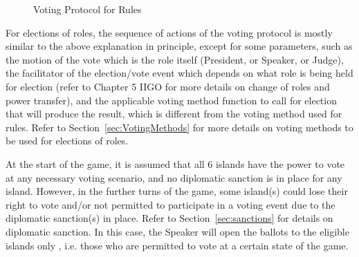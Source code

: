 \begin{figure}[!htb]
\begin{center}
\caption{Voting Protocol for Rules}
\label{fig:RONRVotingProtocol}
\end{center}
\end{figure}

For elections of roles, the sequence of actions of the voting protocol is mostly similar to the above explanation in principle, except for some parameters, such as the motion of the vote which is the role itself (President, or Speaker, or Judge), the facilitator of the election/vote event which depends on what role is being held for election (refer to Chapter 5 IIGO for more details on change of roles and power transfer), and the applicable voting method function to call for election that will produce the result, which is different from the voting method used for rules. Refer to Section~\ref{sec:VotingMethods} for more details on voting methods to be used for elections of roles.

At the start of the game, it is assumed that all 6 islands have the power to vote at any necessary voting scenario, and no diplomatic sanction is in place for any island. However, in the further turns of the game, some island(s) could lose their right to vote and/or not permitted to participate in a voting event due to the diplomatic sanction(s) in place. Refer to Section~\ref{sec:sanctions} for details on diplomatic sanction. In this case, the Speaker will open the ballots to the eligible islands only , i.e. those who are permitted to vote at a certain state of the game.


